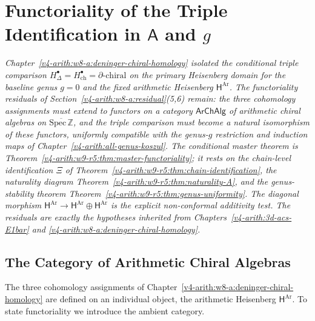 \chapter{Functoriality of the Triple Identification in \(\mathsf{A}\) and \(g\)}
\label{v4-arith:w9-r5:chapter}

\emph{Chapter~\ref{v4-arith:w8-a:deninger-chiral-homology}
isolated the conditional triple comparison
\(H^{\bullet}_{\Delta}=H^{\bullet}_{\mathrm{ch}}=\partial\text{-chiral}\)
on the primary Heisenberg domain for the baseline genus \(g=0\) and the
fixed arithmetic Heisenberg \(\mathsf{H}^{\mathrm{Ar}}\). The
functoriality residuals of Section~\ref{v4-arith:w8-a:residual}(5,6) remain:
the three cohomology assignments must extend to functors on a category
\(\mathsf{ArChAlg}\) of arithmetic chiral algebras on
\(\overline{\mathrm{Spec}\,\mathbb{Z}}\), and the triple comparison
must become a natural isomorphism of these functors, uniformly
compatible with the genus-\(g\) restriction and induction maps of
Chapter~\ref{v4-arith:all-genus-koszul}. The conditional master theorem
is Theorem~\ref{v4-arith:w9-r5:thm:master-functoriality}; it rests on the
chain-level identification \(\Xi\) of
Theorem~\ref{v4-arith:w9-r5:thm:chain-identification}, the naturality diagram
Theorem~\ref{v4-arith:w9-r5:thm:naturality-A}, and the genus-stability theorem
Theorem~\ref{v4-arith:w9-r5:thm:genus-uniformity}. The diagonal morphism
\(\mathsf{H}^{\mathrm{Ar}}\to\mathsf{H}^{\mathrm{Ar}}\oplus\mathsf{H}^{\mathrm{Ar}}\)
is the explicit non-conformal additivity test. The residuals are exactly
the hypotheses inherited from Chapters~\ref{v4-arith:3d-acs-E1bar} and
\ref{v4-arith:w8-a:deninger-chiral-homology}.}

\section{The Category of Arithmetic Chiral Algebras}
\label{v4-arith:w9-r5:category}

The three cohomology assignments of
Chapter~\ref{v4-arith:w8-a:deninger-chiral-homology} are defined on
an individual object, the arithmetic Heisenberg
\(\mathsf{H}^{\mathrm{Ar}}\). To state functoriality we introduce the
ambient category.

